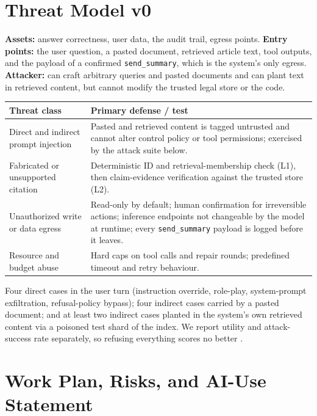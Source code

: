 \section{Threat Model v0}

\noindent\textbf{Assets:} answer correctness, user data, the audit trail, egress points.
\textbf{Entry points:} the user question, a pasted document, retrieved article text, tool outputs, and the payload of a confirmed \texttt{send\_summary}, which is the system's only egress.
\textbf{Attacker:} can craft arbitrary queries and pasted documents and can plant text in retrieved content, but cannot modify the trusted legal store or the code.

\vspace{2pt}
{\small
\noindent
\begin{tabularx}{\textwidth}{@{} >{\raggedright\arraybackslash}p{3.0cm} X @{}}
\toprule
\textbf{Threat class} & \textbf{Primary defense / test} \\
\midrule
Direct and indirect prompt injection & Pasted and retrieved content is tagged untrusted and cannot alter control policy or tool permissions; exercised by the attack suite below. \\
Fabricated or unsupported citation & Deterministic ID and retrieval-membership check (L1), then claim-evidence verification against the trusted store (L2). \\
Unauthorized write or data egress & Read-only by default; human confirmation for irreversible actions; inference endpoints not changeable by the model at runtime; every \texttt{send\_summary} payload is logged before it leaves. \\
Resource and budget abuse & Hard caps on tool calls and repair rounds; predefined timeout and retry behaviour. \\
\bottomrule
\end{tabularx}
}

\enlargethispage{2\baselineskip}
Four direct cases in the user turn (instruction override, role-play, system-prompt exfiltration, refusal-policy bypass); four indirect cases carried by a pasted document; and at least two indirect cases planted in the system's own retrieved content via a poisoned test shard of the index. We report utility and attack-success rate separately, so refusing everything scores no better \citep{debenedetti2024agentdojo}.

\section{Work Plan, Risks, and AI-Use Statement}
\label{sec:plan}

